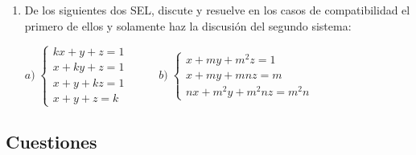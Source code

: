 \begin{enumerate}
\item De los siguientes dos SEL, discute y resuelve en los casos de compatibilidad el primero de ellos y solamente haz la discusión del segundo sistema:

$a)\; \begin{cases} kx+y+z=1\\x+ky+z=1\\x+y+kz=1\\x+y+z=k \end{cases}$
$ \qquad $
$b)\; \begin{cases} x+my+m^2z=1\\x+my+mnz=m\\nx+m^2y+m^2nz=m^2n \end{cases}$


  
\end{enumerate}


\subsection{Cuestiones}

